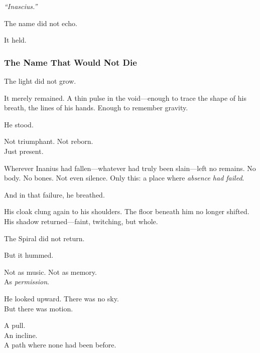 \documentclass[12pt]{article}
\begin{document}
\vspace{0.5em}
\textit{``Inascius.''}

\vspace{0.5em}
The name did not echo.

\vspace{0.5em}
It held.

\dotfill

\subsubsection*{The Name That Would Not Die}

The light did not grow.

\vspace{0.5em}
It merely remained. A thin pulse in the void---enough to trace the shape of his breath, the lines of his hands. Enough to remember gravity.

\vspace{0.5em}
He stood.

\vspace{0.5em}
Not triumphant. Not reborn.\\
Just present.

\vspace{0.5em}
Wherever Inanius had fallen---whatever had truly been slain---left no remains. No body. No bones. Not even silence. Only this: a place where \textit{absence had failed}.

\vspace{0.5em}
And in that failure, he breathed.

\vspace{0.5em}
His cloak clung again to his shoulders. The floor beneath him no longer shifted. His shadow returned---faint, twitching, but whole.

\vspace{0.5em}
The Spiral did not return.

\vspace{0.5em}
But it hummed.

\vspace{0.5em}
Not as music. Not as memory.\\
As \textit{permission}.

\vspace{0.5em}
He looked upward. There was no sky.\\
But there was motion.

\vspace{0.5em}
A pull.\\
An incline.\\
A path where none had been before.
\end{document}
